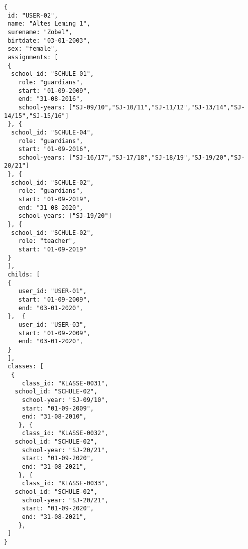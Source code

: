 
\begin{lstlisting}[caption={Beispiel für Benutzer mit Rollen \"teachers\" und \"guardians\"},frame=tlrb]
{
 id: "USER-02",
 name: "Altes Leming 1",
 surename: "Zobel",
 birtdate: "03-01-2003",
 sex: "female",
 assignments: [
 {
  school_id: "SCHULE-01",
	role: "guardians",
	start: "01-09-2009",
	end: "31-08-2016",
	school-years: ["SJ-09/10","SJ-10/11","SJ-11/12","SJ-13/14","SJ-14/15","SJ-15/16"]
 }, {
  school_id: "SCHULE-04",
	role: "guardians",
	start: "01-09-2016",
	school-years: ["SJ-16/17","SJ-17/18","SJ-18/19","SJ-19/20","SJ-20/21"]
 }, {
  school_id: "SCHULE-02",
	role: "guardians",
	start: "01-09-2019",
	end: "31-08-2020",
	school-years: ["SJ-19/20"]
 }, {
  school_id: "SCHULE-02",
	role: "teacher",
	start: "01-09-2019"
 }
 ],
 childs: [
 {
	user_id: "USER-01",
	start: "01-09-2009",
	end: "03-01-2020",
 },  {
	user_id: "USER-03",
	start: "01-09-2009",
	end: "03-01-2020",
 }
 ],
 classes: [
  {
	 class_id: "KLASSE-0031",
   school_id: "SCHULE-02",
	 school-year: "SJ-09/10",
	 start: "01-09-2009",
	 end: "31-08-2010",
	}, {
	 class_id: "KLASSE-0032",
   school_id: "SCHULE-02",
	 school-year: "SJ-20/21",
	 start: "01-09-2020",
	 end: "31-08-2021",
	}, {
	 class_id: "KLASSE-0033",
   school_id: "SCHULE-02",
	 school-year: "SJ-20/21",
	 start: "01-09-2020",
	 end: "31-08-2021",
	}, 
 ]
}
\end{lstlisting}